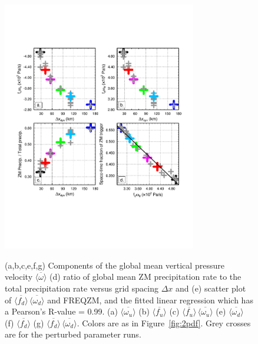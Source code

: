 \begin{figure}[t]
\begin{center}
\noindent\includegraphics[width=20pc,angle=0]{figs/temp_diags_4panel.pdf}\\
\end{center}
\caption{(a,b,c,e,f,g) Components of the global mean vertical pressure velocity $\overline{\langle \omega \rangle}$ (d) ratio of global mean ZM precipitation rate to the total precipitation rate versus grid spacing $\Delta x$ and (e) scatter plot of $\overline{\langle f_{d} \rangle} \, \overline{\langle \omega_{d} \rangle}$ and FREQZM, and the fitted linear regression which has a Pearson's R-value = 0.99. (a) $\overline{\langle \omega_{u} \rangle}$ (b) $\overline{\langle f_{u} \rangle}$ (c) $\overline{\langle f_{u} \rangle} \, \overline{\langle \omega_{u} \rangle}$ (e) $\overline{\langle \omega_{d} \rangle}$ (f) $ \overline{\langle f_{d} \rangle}$ (g) $\overline{\langle f_{d} \rangle} \, \overline{\langle \omega_{d} \rangle}$. Colors are as in Figure~\ref{fig:2pdf}. Grey crosses are for the perturbed parameter runs.}
\label{fig:4panel}
\end{figure}

